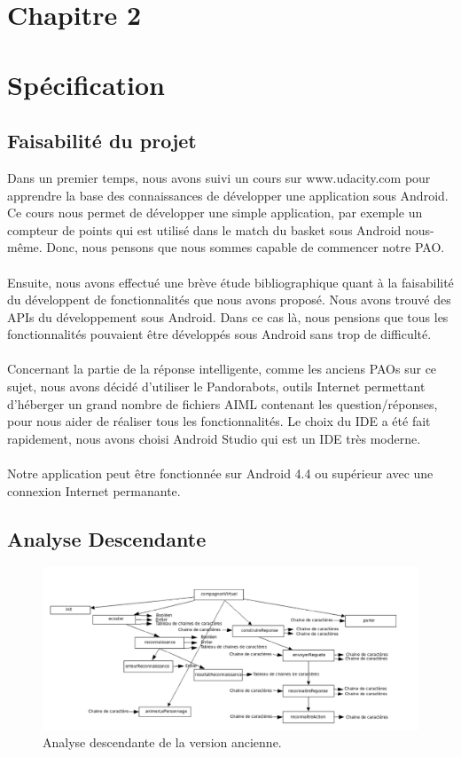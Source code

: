 \section*{Chapitre 2}
\section{Spécification}
\subsection{Faisabilité du projet}
Dans un premier temps, nous avons suivi un cours sur www.udacity.com pour apprendre la base des connaissances de développer une application sous Android. Ce cours nous permet de développer une simple application, par exemple un compteur de points qui est utilisé dans le match du basket sous Android nous-même. Donc, nous pensons que nous sommes capable de commencer notre PAO.\\\\
\indent Ensuite, nous avons effectué une brève étude bibliographique quant à la faisabilité du développent de fonctionnalités que nous avons proposé. Nous avons trouvé des APIs du développement sous Android. Dans ce cas là, nous pensions que tous les fonctionnalités pouvaient être développés sous Android sans trop de difficulté. \\\\
\indent Concernant la partie de la réponse intelligente, comme les anciens PAOs sur ce sujet, nous avons décidé d'utiliser le Pandorabots, outils Internet permettant d'héberger un grand nombre de fichiers AIML contenant les question/réponses, pour nous aider de réaliser tous les fonctionnalités.
Le choix du IDE a été fait rapidement, nous avons choisi Android Studio qui est un IDE très moderne. \\\\
\indent Notre application peut être fonctionnée sur Android 4.4 ou supérieur avec une connexion Internet permanante.\\

\subsection{Analyse Descendante}
\begin{figure}[h]
\centering
\includegraphics[width=1\linewidth]{analyseDescendante.png}
\caption{Analyse descendante de la version ancienne.\label{fig1}}
\end{figure}
